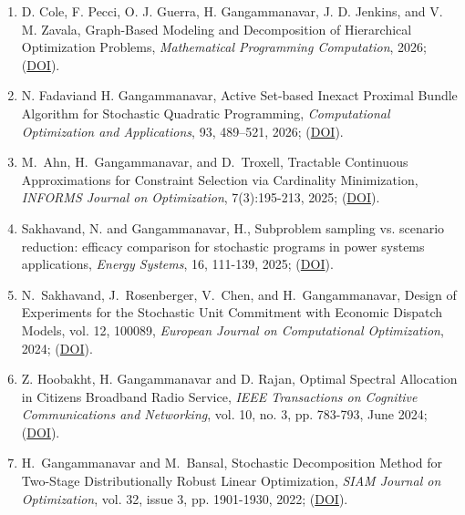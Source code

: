 \documentclass[hyperref, margin]{myResume}
\begin{document}
\begin{resume}
\begin{enumerate}[label=J\arabic*., leftmargin=*]
	\item D. Cole, F. Pecci, O. J. Guerra, H. Gangammanavar, J. D. Jenkins, and V. M. Zavala, Graph-Based Modeling and Decomposition of Hierarchical Optimization Problems, \textit{Mathematical Programming Computation},  2026; (\href{https://link.springer.com/article/10.1007/s12532-026-00315-4}{DOI}).
	\item N. Fadavi\footnotemark[1] and H. Gangammanavar, Active Set-based Inexact Proximal Bundle Algorithm for Stochastic Quadratic Programming, \textit{Computational Optimization and Applications}, 93, 489–521, 2026; (\href{https://doi.org/10.1007/s10589-025-00739-z}{DOI}).
	
	\item M.\ Ahn, H.\ Gangammanavar, and D.\ Troxell\footnotemark[2], Tractable Continuous Approximations for Constraint Selection via Cardinality Minimization, \textit{INFORMS Journal on Optimization}, 7(3):195-213, 2025; (\href{https://doi.org/10.1287/ijoo.2024.0038}{DOI}).
	
	\item Sakhavand, N. and Gangammanavar, H., Subproblem sampling vs. scenario reduction: efficacy comparison for stochastic programs in power systems applications, \textit{Energy Systems}, 16, 111-139, 2025; (\href{https://doi.org/10.1007/s12667-022-00558-9}{DOI}).

	\item N.\ Sakhavand\footnotemark[3], J.\ Rosenberger, V.\ Chen, and H.\ Gangammanavar, Design of Experiments for the Stochastic Unit Commitment with Economic Dispatch Models, vol. 12, 100089, \textit{European Journal on Computational Optimization}, 2024; (\href{https://doi.org/10.1016/j.ejco.2024.100089}{DOI}). 

	\item Z. Hoobakht\footnotemark[3], H. Gangammanavar and D. Rajan, Optimal Spectral Allocation in Citizens Broadband Radio Service,  \textit{IEEE Transactions on Cognitive Communications and Networking}, vol. 10, no. 3, pp. 783-793, June 2024; (\href{https://doi.org/10.1109/TCCN.2024.3384491}{DOI}).
	
	\item H.\ Gangammanavar and M.\ Bansal, Stochastic Decomposition Method for Two-Stage Distributionally Robust Linear Optimization, \textit{SIAM Journal on Optimization}, vol. 32, issue 3, pp. 1901-1930, 2022; (\href{https://doi.org/10.1137/20M1378600}{DOI}).
	

\end{enumerate}
\end{resume}
\end{document}
